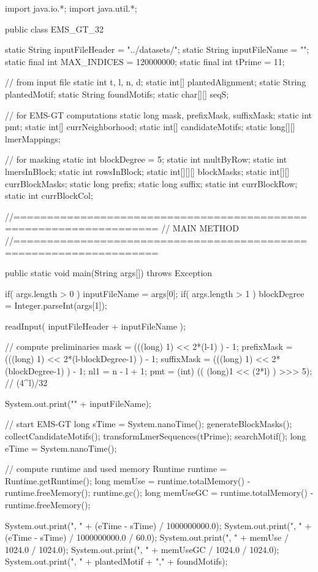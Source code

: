 \documentclass[oneside,12pt]{DISCSthesis}
\begin{document}
{\begin{footnotesize}
\begin{verbatimtab}[2]
import java.io.*;
import java.util.*;

public class EMS_GT_32 {

	static String inputFileHeader = "../datasets/";
	static String inputFileName = "";
	static final int MAX_INDICES = 120000000;
	static final int tPrime = 11;

	// from input file
	static int t, l, n, d;
	static int[] plantedAlignment;
	static String plantedMotif;
	static String foundMotifs;
	static char[][] seqS;

	// for EMS-GT computations
	static long mask, prefixMask, suffixMask;
	static int pmt;
	static int[] currNeighborhood;
	static int[] candidateMotifs;
	static long[][] lmerMappings;

	// for masking
	static int blockDegree = 5;
	static int multByRow;
	static int lmersInBlock;
	static int rowsInBlock;
	static int[][][] blockMasks;
	static int[][] currBlockMasks;
	static long prefix;
	static long suffix;
	static int currBlockRow;
	static int currBlockCol;
	
//===================================================================
// MAIN METHOD
//===================================================================

	public static void main(String args[]) throws Exception {
		if( args.length > 0 ) {
			inputFileName = args[0];
			if( args.length > 1 ) {
				blockDegree = Integer.parseInt(args[1]);
			}
		}

		readInput( inputFileHeader + inputFileName );

		// compute preliminaries
		mask = (((long) 1) << 2*(l-1) ) - 1;
		prefixMask = (((long) 1) << 2*(l-blockDegree-1) ) - 1;
		suffixMask = (((long) 1) << 2*(blockDegree-1) ) - 1;
		nl1 = n - l + 1;
		pmt = (int) (( (long)1 << (2*l) ) >>> 5); // (4^l)/32
		
		System.out.print("\n" + inputFileName);
		
		// start EMS-GT
		long sTime = System.nanoTime();
		generateBlockMasks();
		collectCandidateMotifs();
		transformLmerSequences(tPrime);
		searchMotif();		
		long eTime = System.nanoTime();

		// compute runtime and used memory
		Runtime runtime = Runtime.getRuntime();
		long memUse = runtime.totalMemory() - runtime.freeMemory();
		runtime.gc();
		long memUseGC = runtime.totalMemory() - runtime.freeMemory();

		System.out.print(", " + (eTime - sTime) / 1000000000.0);
		System.out.print(", " + (eTime - sTime) / 1000000000.0 / 60.0);
		System.out.print(", " + memUse / 1024.0 / 1024.0);
		System.out.print(", " + memUseGC / 1024.0 / 1024.0);
		System.out.print(", " + plantedMotif + "," + foundMotifs);
	}

}
\end{verbatimtab}
\end{footnotesize}}
\end{document}
